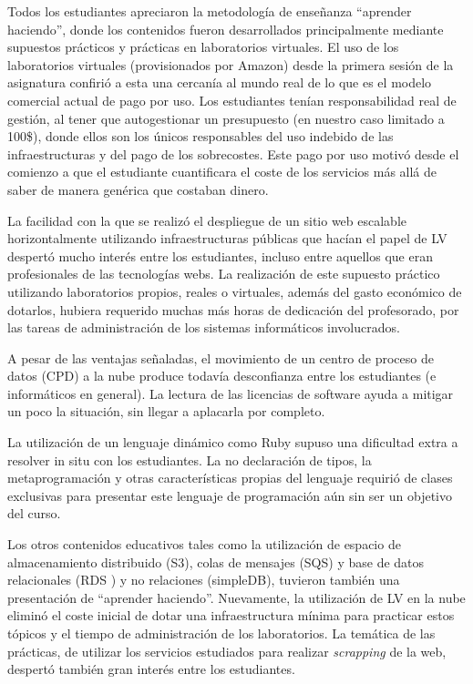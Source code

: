 \documentclass[conference]{IEEEtran}
\begin{document}
Todos los estudiantes apreciaron la metodología de enseñanza ``aprender
haciendo'', donde los contenidos fueron desarrollados principalmente mediante
supuestos prácticos y prácticas en laboratorios virtuales. El uso de los
laboratorios virtuales (provisionados por Amazon) desde la primera sesión de la
asignatura confirió a esta una cercanía al mundo real de lo que es el modelo comercial actual de pago por
uso. Los estudiantes tenían responsabilidad real de
gestión,  al tener que  autogestionar un presupuesto (en nuestro caso limitado a
100\$), donde ellos son los únicos responsables del uso indebido de las
infraestructuras y del pago de los sobrecostes. Este pago por uso motivó desde
el comienzo a que el estudiante cuantificara el coste de los servicios más allá
de saber de manera genérica que costaban dinero. 

La facilidad con la que se realizó el despliegue de un sitio web escalable
horizontalmente utilizando infraestructuras públicas que hacían el papel de LV
despertó mucho interés entre los estudiantes, incluso entre aquellos que eran
profesionales de las tecnologías webs. La realización de este supuesto práctico
utilizando laboratorios propios, reales o virtuales, además del gasto
económico de dotarlos, hubiera requerido muchas más horas de
dedicación del profesorado, por las tareas de administración de los sistemas
informáticos involucrados.

A pesar de las ventajas señaladas, el movimiento de un centro de proceso de datos (CPD) 
a la nube produce todavía desconfianza entre los estudiantes (e informáticos en general).
La lectura de las licencias de software ayuda a mitigar un poco la situación, sin llegar a
aplacarla por completo.

La utilización de un lenguaje dinámico como Ruby supuso una dificultad extra a
resolver in situ con los estudiantes. La no declaración de tipos, la
metaprogramación y otras características propias del lenguaje requirió de
clases exclusivas para presentar este lenguaje de programación aún sin ser un
objetivo del curso. 

Los otros contenidos educativos tales como la utilización de espacio de
almacenamiento distribuido (S3), colas de mensajes (SQS) y  base de datos
relacionales (RDS ) y no relaciones (simpleDB), tuvieron también una presentación
de ``aprender haciendo''. Nuevamente, la utilización de LV en la nube eliminó el
coste inicial de dotar una infraestructura mínima para practicar estos tópicos
y el tiempo de administración de los  laboratorios. La temática de las
prácticas, de utilizar los servicios estudiados  para
realizar \textit{scrapping} de la web, despertó también gran interés entre los
estudiantes.
\end{document}
